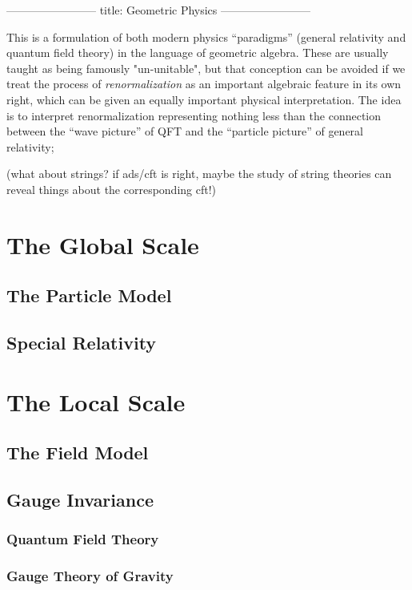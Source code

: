 ------------------------
title: Geometric Physics
------------------------

This is a formulation of both modern physics ``paradigms'' (general relativity and quantum field theory) in the language of geometric algebra. These are usually taught as being famously "un-unitable", but that conception can be avoided if we treat the process of \emph{renormalization} as an important algebraic feature in its own right, which can be given an equally important physical interpretation. The idea is to interpret renormalization representing nothing less than the connection between the ``wave picture'' of QFT and the ``particle picture'' of general relativity; 
 
(what about strings? if ads/cft is right, maybe the study of string theories can reveal things about the corresponding cft!)

\section{The Global Scale}

\subsection{The Particle Model}

\subsection{Special Relativity}

\section{The Local Scale}

\subsection{The Field Model}

\subsection{Gauge Invariance}

\subsubsection{Quantum Field Theory}

\subsubsection{Gauge Theory of Gravity}

